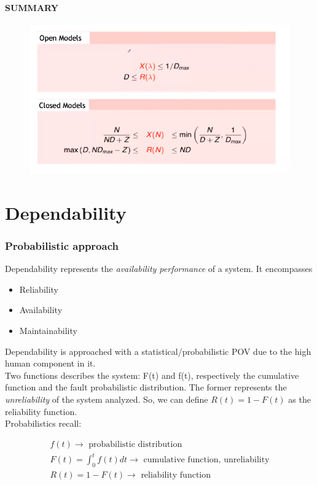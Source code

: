 \documentclass[10pt,a4paper]{article}
\begin{document}
				
			\subsection{SUMMARY}	
				\begin{figure}
					\centering
					\includegraphics[width = \textwidth]{./images/superSummary2.png}
				\end{figure}
				
	\clearpage \part{Dependability}
		\section{Probabilistic approach}
			Dependability represents the \emph{availability performance} of a system. It encompasses 
			\begin{itemize}
				\item Reliability
				\item Availability
				\item Maintainability
			\end{itemize}
			
			Dependability is approached with a statistical/probabilistic POV due to the high human component in it.\\
			Two functions describes the system: F(t) and f(t), respectively the cumulative function and the fault probabilistic distribution. The former represents the \emph{unreliability} of the system analyzed. So, we can define $R(t) =  1 - F(t)$ as the reliability function.\\
			Probabilistics recall:

			\begin{align}
				f(t) \rightarrow \text{ probabilistic distribution}\\
				F(t) = \int_{0}^{t}f(t)dt \rightarrow \text{ cumulative function, unreliability}\\
				R(t) = 1 - F(t) \rightarrow \text{ reliability function}
			\end{align}
\end{document}
